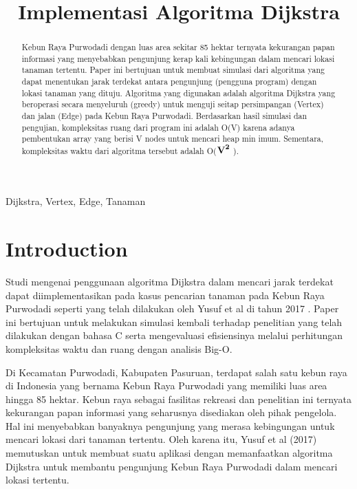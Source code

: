 \documentclass[conference]{IEEEtran}
\title{Implementasi Algoritma Dijkstra}
\author{\IEEEauthorblockN{Muhammad Faiz Syukra}
\IEEEauthorblockA{\textit{School of Electrical Engineering and Informatics}\\
\textit{Institut Teknologi Bandung}\\
Bandung, Indonesia\\
email: 18320027@std.stei.itb.ac.id}
}
\begin{document}
\maketitle
\begin{abstract}
Kebun Raya Purwodadi dengan luas area sekitar 85 hektar ternyata kekurangan papan informasi yang menyebabkan pengunjung kerap kali kebingungan dalam mencari lokasi tanaman tertentu. Paper ini bertujuan untuk membuat simulasi dari algoritma yang dapat menentukan jarak terdekat antara pengunjung (pengguna program) dengan lokasi tanaman yang dituju. Algoritma yang digunakan adalah algoritma Dijkstra yang beroperasi secara menyeluruh (greedy) untuk menguji seitap persimpangan (Vertex) dan jalan (Edge) pada Kebun Raya Purwodadi. Berdasarkan hasil simulasi dan pengujian, kompleksitas ruang dari program ini adalah O(V) karena adanya pembentukan array yang berisi V nodes untuk mencari heap min imum. Sementara, kompleksitas waktu dari algoritma tersebut adalah O($\textbf V^\textbf2$ ).
\end{abstract}

\begin{IEEEkeywords}
Dijkstra, Vertex, Edge, Tanaman
\end{IEEEkeywords}

\section{Introduction}
	Studi mengenai penggunaan algoritma Dijkstra dalam mencari jarak terdekat dapat diimplementasikan pada kasus pencarian tanaman pada Kebun Raya Purwodadi seperti yang telah dilakukan oleh Yusuf et al di tahun 2017\cite{yusuf2017implementasi} . Paper ini bertujuan untuk melakukan simulasi kembali terhadap penelitian yang telah dilakukan dengan bahasa C serta mengevaluasi efisiensinya melalui perhitungan kompleksitas waktu dan ruang dengan analisis Big-O.

	Di Kecamatan Purwodadi, Kabupaten Pasuruan, terdapat salah satu kebun raya di Indonesia yang bernama Kebun Raya Purwodadi yang memiliki luas area hingga 85 hektar. Kebun raya sebagai fasilitas rekreasi dan penelitian ini ternyata kekurangan papan informasi yang seharusnya disediakan oleh pihak pengelola. Hal ini menyebabkan banyaknya pengunjung yang merasa kebingungan untuk mencari lokasi dari tanaman tertentu. Oleh karena itu, Yusuf et al (2017) memutuskan untuk membuat suatu aplikasi dengan memanfaatkan algoritma Dijkstra untuk membantu pengunjung Kebun Raya Purwodadi dalam mencari lokasi tertentu.
\end{document}
